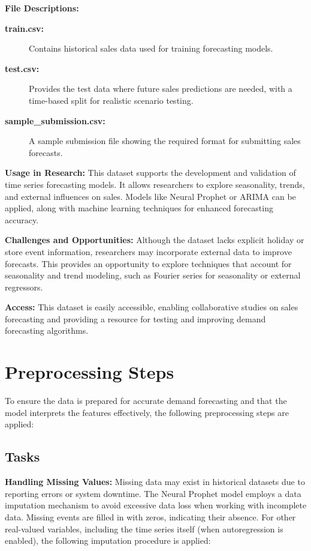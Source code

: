 \textbf{File Descriptions:}
\begin{description}
    \item[\textbf{train.csv:}] Contains historical sales data used for training forecasting models.
    \item[\textbf{test.csv:}] Provides the test data where future sales predictions are needed, with a time-based split for realistic scenario testing.
    \item[\textbf{sample\_submission.csv:}] A sample submission file showing the required format for submitting sales forecasts.
\end{description}

\textbf{Usage in Research:} This dataset supports the development and validation of time series forecasting models. It allows researchers to explore seasonality, trends, and external influences on sales. Models like Neural Prophet or ARIMA can be applied, along with machine learning techniques for enhanced forecasting accuracy.

\textbf{Challenges and Opportunities:} Although the dataset lacks explicit holiday or store event information, researchers may incorporate external data to improve forecasts. This provides an opportunity to explore techniques that account for seasonality and trend modeling, such as Fourier series for seasonality or external regressors.

\textbf{Access:} This dataset is easily accessible, enabling collaborative studies on sales forecasting and providing a resource for testing and improving demand forecasting algorithms.


\section{Preprocessing Steps}

To ensure the data is prepared for accurate demand forecasting and that the model interprets the features effectively, the following preprocessing steps are applied:

\subsection*{Tasks}

\textbf{Handling Missing Values:} Missing data may exist in historical datasets due to reporting errors or system downtime. The Neural Prophet model employs a data imputation mechanism to avoid excessive data loss when working with incomplete data. Missing events are filled in with zeros, indicating their absence. For other real-valued variables, including the time series itself (when autoregression is enabled), the following imputation procedure is applied:

